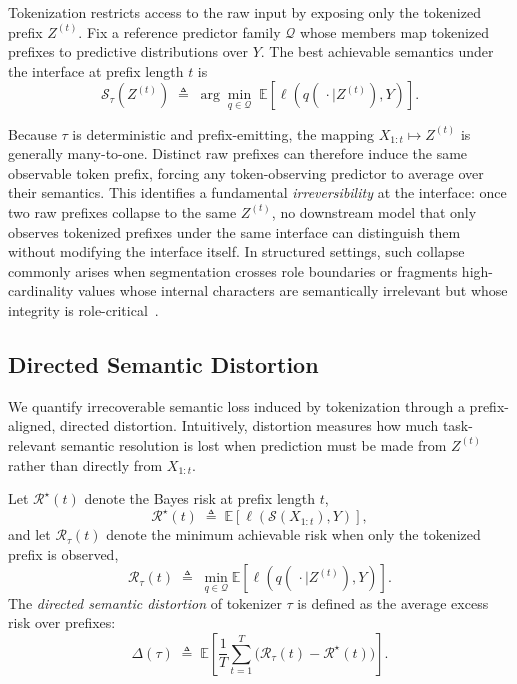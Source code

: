 Tokenization restricts access to the raw input by exposing only the tokenized prefix $Z^{(t)}$.
Fix a reference predictor family $\mathcal{Q}$ whose members map tokenized prefixes to predictive distributions over $Y$.
The best achievable semantics under the interface at prefix length $t$ is
\begin{equation}
\mathcal{S}_\tau(Z^{(t)})
\;\triangleq\;
\arg\min_{q \in \mathcal{Q}}
\;
\mathbb{E}\!\left[\ell\!\left(q(\,\cdot \mid Z^{(t)}), Y\right)\right].
\label{eq:semantic_tok}
\end{equation}

Because $\tau$ is deterministic and prefix-emitting, the mapping $X_{1:t} \mapsto Z^{(t)}$ is generally many-to-one.
Distinct raw prefixes can therefore induce the same observable token prefix, forcing any token-observing predictor to average over their semantics.
This identifies a fundamental \emph{irreversibility} at the interface: once two raw prefixes collapse to the same $Z^{(t)}$, no downstream model that only observes tokenized prefixes under the same interface can distinguish them without modifying the interface itself.
In structured settings, such collapse commonly arises when segmentation crosses role boundaries or fragments high-cardinality values whose internal characters are semantically irrelevant but whose integrity is role-critical~\cite{yin2020tabert,herzig2020tapas}.

\subsection{Directed Semantic Distortion}
\label{sec:distortion}

We quantify irrecoverable semantic loss induced by tokenization through a prefix-aligned, directed distortion.
Intuitively, distortion measures how much task-relevant semantic resolution is lost when prediction must be made from $Z^{(t)}$ rather than directly from $X_{1:t}$.

Let $\mathcal{R}^\star(t)$ denote the Bayes risk at prefix length $t$,
\begin{equation}
\mathcal{R}^\star(t)
\;\triangleq\;
\mathbb{E}\!\left[\ell\!\left(\mathcal{S}(X_{1:t}), Y\right)\right],
\label{eq:bayes_raw}
\end{equation}
and let $\mathcal{R}_\tau(t)$ denote the minimum achievable risk when only the tokenized prefix is observed,
\begin{equation}
\mathcal{R}_\tau(t)
\;\triangleq\;
\min_{q \in \mathcal{Q}}
\mathbb{E}\!\left[\ell\!\left(q(\,\cdot \mid Z^{(t)}), Y\right)\right].
\label{eq:bayes_tok}
\end{equation}
The \emph{directed semantic distortion} of tokenizer $\tau$ is defined as the average excess risk over prefixes:
\begin{equation}
\Delta(\tau)
\;\triangleq\;
\mathbb{E}\!\left[
\frac{1}{T}\sum_{t=1}^{T}
\big(\mathcal{R}_\tau(t) - \mathcal{R}^\star(t)\big)
\right].
\label{eq:distortion}
\end{equation}

